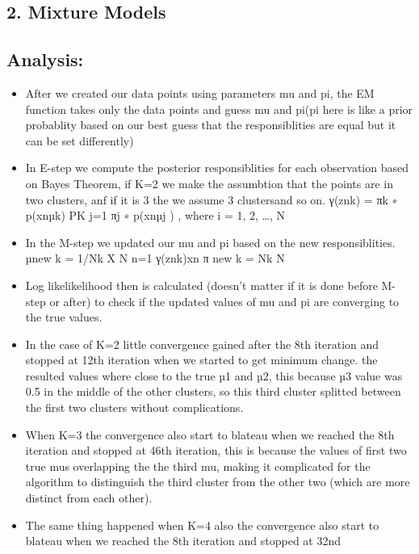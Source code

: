 \documentclass[]{article}
\providecommand{\tightlist}{%
  \setlength{\itemsep}{0pt}\setlength{\parskip}{0pt}}
\begin{document}
\hypertarget{mixture-models}{%
\subsection{2. Mixture Models}\label{mixture-models}}

\hypertarget{analysis}{%
\subsection{Analysis:}\label{analysis}}

\begin{itemize}
\tightlist
\item
  After we created our data points using parameters mu and pi, the EM
  function takes only the data points and guess mu and pi(pi here is
  like a prior probablity based on our best guess that the
  responsiblities are equal but it can be set differently)
\item
  In E-step we compute the posterior responsiblities for each
  observation based on Bayes Theorem, if K=2 we make the assumbtion that
  the points are in two clusters, anf if it is 3 the we assume 3
  clustersand so on. γ(znk) = πk ∗ p(xn\textbar{}µk) PK j=1 πj ∗
  p(xn\textbar{}µj ) , where i = 1, 2, \ldots{}, N
\item
  In the M-step we updated our mu and pi based on the new
  responsiblities. µnew k = 1/Nk X N n=1 γ(znk)xn π new k = Nk N
\item
  Log likelikelihood then is calculated (doesn't matter if it is done
  before M-step or after) to check if the updated values of mu and pi
  are converging to the true values.
\item
  In the case of K=2 little convergence gained after the 8th iteration
  and stopped at 12th iteration when we started to get minimum change.
  the resulted values where close to the true µ1 and µ2, this because µ3
  value was 0.5 in the middle of the other clusters, so this third
  cluster splitted between the first two clusters without complications.
\item
  When K=3 the convergence also start to blateau when we reached the 8th
  iteration and stopped at 46th iteration, this is because the values of
  first two true mus overlapping the the third mu, making it complicated
  for the algorithm to distinguish the third cluster from the other two
  (which are more distinct from each other).
\item
  The same thing happened when K=4 also the convergence also start to
  blateau when we reached the 8th iteration and stopped at 32nd

\end{itemize}
\end{document}
